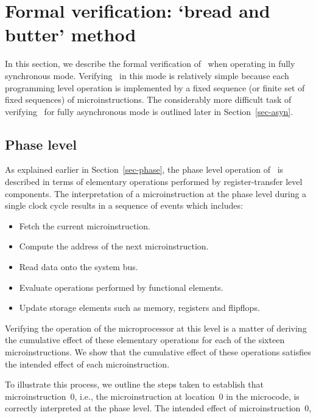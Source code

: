 \section{Formal verification: `bread and butter' method}
\label{sec-verf}

In this section, we
describe the formal verification
of \Tamarack\ when operating in fully synchronous mode.
Verifying \Tamarack\ in this mode
is relatively simple because each programming level operation is
implemented by a fixed sequence (or finite set of fixed sequences)
of microinstructions.
The considerably more difficult task of verifying
\Tamarack\ for fully asynchronous
mode is outlined later in Section~\ref{sec-asyn}.

\subsection{Phase level}
\label{sec-verfphase}

As explained earlier in Section~\ref{sec-phase},
the phase level operation of \Tamarack\ is described in terms
of elementary operations performed by register-transfer level components.
The interpretation of a microinstruction at the phase level during
a single clock cycle results in a sequence of events which includes:

\begin{center}
\begin{itemize}
\item Fetch the current microinstruction.
\item Compute the address of the next microinstruction.
\item Read data onto the system bus.
\item Evaluate operations performed by functional elements.
\item Update storage elements such as memory, registers and flipflops.
\end{itemize}
\end{center}

Verifying the operation of the microprocessor at this level
is a matter of deriving the cumulative effect of these elementary operations
for each of the sixteen microinstructions.
We show that the cumulative effect of these operations satisfies the
intended effect of each microinstruction.

To illustrate this process,
we outline the steps taken to establish
that microinstruction~0, i.e., the microinstruction at
location~0 in the microcode,
is correctly interpreted at the phase level.
The intended effect of \mbox{microinstruction 0},

